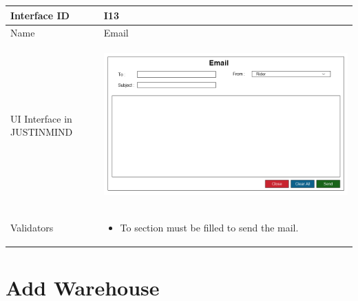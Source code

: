 \documentclass[12pt,a4paper]{report}
\begin{document}
\begin{tabular}{ | m{3cm} | m{12cm}| } \hline

Interface ID & I13  \\\hline

Name  & Email \\ \hline

UI Interface in JUSTINMIND & \begin{center} \includegraphics[scale=0.3]{./User Interface/UI-012 SendEmail@1x.png}\end{center}  \\ \hline

Validators & 
\begin{itemize}
\item  To section must be filled to send the mail.



\end{itemize}
\\ \hline

\end{tabular} 
\section{Add Warehouse}
\end{document}
